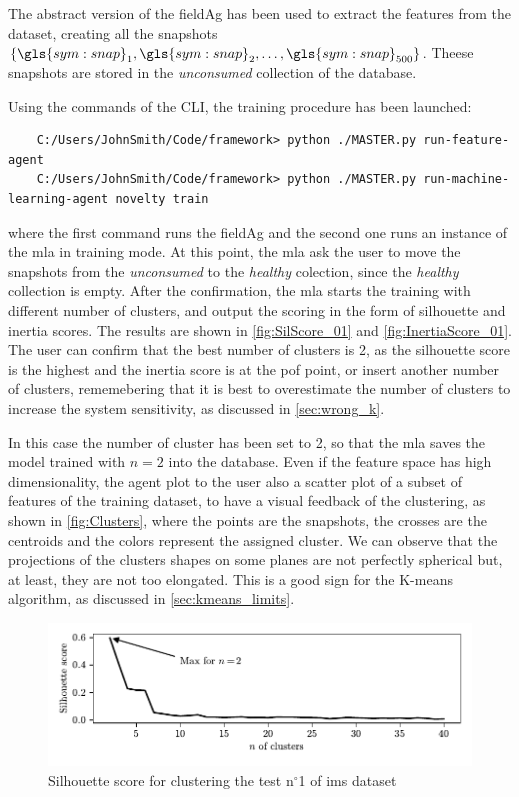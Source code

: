 The abstract version of the \gls{fieldAg} has been used to extract the features from the dataset, creating all the snapshots $\{\gls{sym:snap}_1,\gls{sym:snap}_2,\dots,\gls{sym:snap}_{500}\}$. Theese snapshots are stored in the \emph{unconsumed} collection of the database.

Using the commands of the CLI, the training procedure has been launched:
\begin{verbatim}
    C:/Users/JohnSmith/Code/framework> python ./MASTER.py run-feature-agent
    C:/Users/JohnSmith/Code/framework> python ./MASTER.py run-machine-learning-agent novelty train
\end{verbatim}

where the first command runs the \gls{fieldAg} and the second one runs an  instance of the \gls{mla} in training mode.
At this point, the \gls{mla} ask the user to move the snapshots from the \emph{unconsumed} to the \emph{healthy} colection, since the \emph{healthy} collection is empty. After the confirmation, the \gls{mla} starts the training with different number of clusters, and output the scoring in the form of silhouette and inertia scores. The results are shown in \autoref{fig:SilScore_01} and \autoref{fig:InertiaScore_01}. The user can confirm that the best number of clusters is 2, as the silhouette score is the highest and the inertia score is at the \gls{pof} point, or insert another number of clusters, rememebering that it is best to overestimate the number of clusters to increase the system sensitivity, as discussed in \autoref{sec:wrong_k}. 

In this case the number of cluster has been set to 2, so that the \gls{mla} saves the model trained with $n=2$ into the database. Even if the feature space has high dimensionality, the agent plot to the user also a scatter plot of a subset of features of the training dataset, to have a visual feedback of the clustering, as shown in \autoref{fig:Clusters}, where the points are the snapshots, the crosses are the centroids and the colors represent the assigned cluster. We can observe that the projections of the clusters shapes on some planes are not perfectly spherical but, at least, they are not too elongated. This is a good sign for the K-means algorithm, as discussed in \autoref{sec:kmeans_limits}.

\begin{figure}
    \centering
    \includegraphics{images/IMS/SilScore_01.pdf}
    \caption{Silhouette score for clustering the test $\text{n}^\circ$1 of \gls{ims} dataset}
    \label{fig:SilScore_01}
\end{figure}

